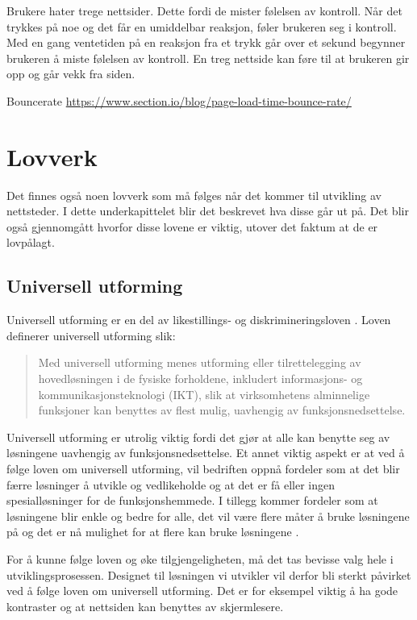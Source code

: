 Brukere hater trege nettsider. Dette fordi de mister følelsen av kontroll. Når det trykkes på noe og det får en umiddelbar reaksjon, føler brukeren seg i kontroll. Med en gang ventetiden på en reaksjon fra et trykk går over et sekund begynner brukeren å miste følelsen av kontroll. En treg nettside kan føre til at brukeren gir opp og går vekk fra siden.

Bouncerate 
\url{https://www.section.io/blog/page-load-time-bounce-rate/ }

\section{Lovverk}
Det finnes også noen lovverk som må følges når det kommer til utvikling av nettsteder. I dette underkapittelet blir det beskrevet hva disse går ut på. Det blir også gjennomgått hvorfor disse lovene er viktig, utover det faktum at de er lovpålagt. 

\subsection{Universell utforming}
\label{sec:universal-design}
Universell utforming er en del av likestillings- og diskrimineringsloven \cite{lovdata2018fou}. Loven definerer universell utforming slik:

\begin{quote}
    Med universell utforming menes utforming eller tilrettelegging av hovedløsningen i de fysiske forholdene, inkludert informasjons- og kommunikasjonsteknologi (IKT), slik at virksomhetens alminnelige funksjoner kan benyttes av flest mulig, uavhengig av funksjonsnedsettelse.
\end{quote}

Universell utforming er utrolig viktig fordi det gjør at alle kan benytte seg av løsningene uavhengig av funksjonsnedsettelse. Et annet viktig aspekt er at ved å følge loven om universell utforming, vil bedriften oppnå fordeler som at det blir færre løsninger å utvikle og vedlikeholde og at det er få eller ingen spesialløsninger for de funksjonshemmede. I tillegg kommer fordeler som at løsningene blir enkle og bedre for alle, det vil være flere måter å bruke løsningene på og det er nå mulighet for at flere kan bruke løsningene \cite{difi2018keu}.

For å kunne følge loven og øke tilgjengeligheten, må det tas bevisse valg hele i utviklingsprosessen. Designet til løsningen vi utvikler vil derfor bli sterkt påvirket ved å følge loven om universell utforming. Det er for eksempel viktig å ha gode kontraster og at nettsiden kan benyttes av skjermlesere. 


